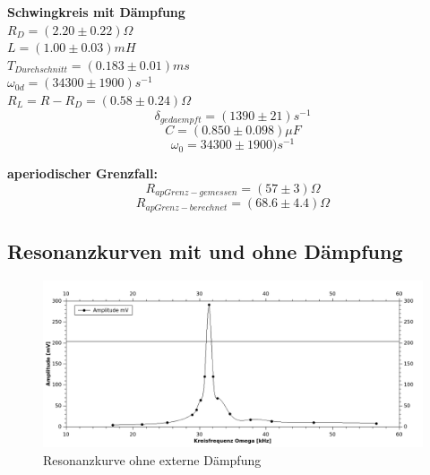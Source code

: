 \documentclass[12pt,a4paper]{article}
\begin{document}
\begin{multicols}{2}


\noindent \textbf{Schwingkreis mit Dämpfung}\\

\noindent $R_D = (2.20\pm 0.22)\Omega$\\
$L=(1.00 \pm 0.03)mH$\\
$T_{Durchschnitt}%
= (0.183  \pm 0.01) ms$\\
$\omega_{0d} = (34300 \pm 1900)s^{-1}$\\
$R_L = R-R_D = (0.58 \pm 0.24)\Omega$ 
$$\delta_{gedaempft} = (1390 \pm 21)s^{-1}$$
$$C = (0.850 \pm 0.098)\mu F$$
$$\omega_{0} = 34300 \pm 1900)s^{-1}$$


\noindent \textbf{aperiodischer Grenzfall:}
$$R_{apGrenz-gemessen} = (57\pm 3)\Omega$$
$$R_{apGrenz-berechnet}=(68.6 \pm 4.4)\Omega$$






\pagebreak
\subsection{Resonanzkurven mit und ohne Dämpfung}


\end{multicols}
\begin{figure}[H]
	\centering
	\includegraphics[scale=1.2]{./figure/resonanz_ohne_ext_daempf.png}
	\caption{Resonanzkurve ohne externe Dämpfung}
	\label{fig:resonanz_ohne}
\end{figure}
\end{document}
